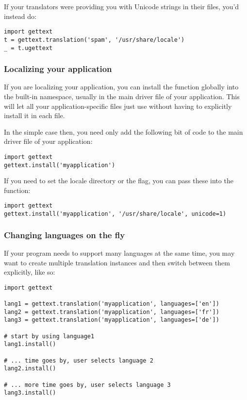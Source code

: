 If your translators were providing you with Unicode strings in their
 files, you'd instead do:

\begin{verbatim}
import gettext
t = gettext.translation('spam', '/usr/share/locale')
_ = t.ugettext
\end{verbatim}

\subsubsection{Localizing your application}

If you are localizing your application, you can install the \function{_()}
function globally into the built-in namespace, usually in the main driver file
of your application.  This will let all your application-specific
files just use  without having to explicitly install it in
each file.

In the simple case then, you need only add the following bit of code
to the main driver file of your application:

\begin{verbatim}
import gettext
gettext.install('myapplication')
\end{verbatim}

If you need to set the locale directory or the  flag,
you can pass these into the  function:

\begin{verbatim}
import gettext
gettext.install('myapplication', '/usr/share/locale', unicode=1)
\end{verbatim}

\subsubsection{Changing languages on the fly}

If your program needs to support many languages at the same time, you
may want to create multiple translation instances and then switch
between them explicitly, like so:

\begin{verbatim}
import gettext

lang1 = gettext.translation('myapplication', languages=['en'])
lang2 = gettext.translation('myapplication', languages=['fr'])
lang3 = gettext.translation('myapplication', languages=['de'])

# start by using language1
lang1.install()

# ... time goes by, user selects language 2
lang2.install()

# ... more time goes by, user selects language 3
lang3.install()
\end{verbatim}

